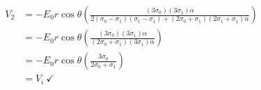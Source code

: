 \begin{displaymath}
    \begin{split}
        V_2
        &=-E_0 r\cos\theta
         \left(
        \frac{
        (3 \sigma_0) (3\sigma_1)\alpha
        }
        {
        2 (\sigma_0-\sigma_1)(\sigma_1 - \sigma_1) + (2\sigma_0 + \sigma_1)(2\sigma_1 + \sigma_1)\alpha
        }
        \right)
        \\
        &=-E_0 r\cos\theta
         \left(
        \frac{
        (3 \sigma_0) (3\sigma_1)\alpha
        }
        {
        (2\sigma_0 + \sigma_1)(3\sigma_1)\alpha
        }
        \right)
        \\
            &=-E_0 r\cos\theta
         \left(
        \frac{
        3 \sigma_0
        }
        {
        2\sigma_0 + \sigma_1
        }
        \right)
        \\
        &=
        V_i ~\checkmark
    \end{split}
\end{displaymath}

